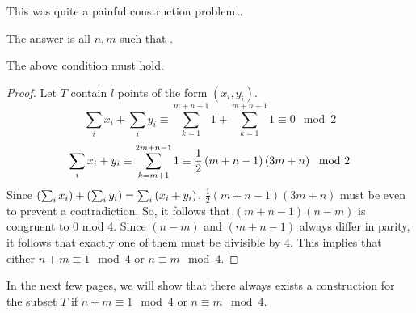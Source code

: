 \documentclass[10pt]{../usamts}
\begin{document}
\begin{solution}
This was quite a painful construction problem\dots

The answer is all $n,m$ such that .

\begin{claim}
    The above condition must hold.
\end{claim}
\begin{proof}
    Let $T$ contain $l$ points of the form $(x_i,y_i)$.
    $$\sum_i x_i + \sum_i y_i \equiv \sum_{k=1}^{m+n-1} 1 + \sum_{k=1}^{m+n-1} 1 \equiv 0 \mod 2$$
    $$\sum_i x_i + y_i \equiv \sum_{k=m+1}^{2m+n-1} 1 \equiv \frac{1}{2} \left( m+n-1 \right)\left( 3m+n \right) \mod 2$$
    Since $\left( \sum_i x_i \right) + \left( \sum_i y_i \right) = \sum_i \left( x_i+y_i \right)$, $\frac{1}{2} (m+n-1)(3m+n)$ must be even to prevent a contradiction.
    So, it follows that $(m+n-1)(n-m)$ is congruent to 0 mod 4. Since $(n-m)$ and $(m+n-1)$ always differ in parity, it follows that exactly one of them must be divisible by 4. This implies that either $n+m \equiv 1 \mod 4$ or $n \equiv m \mod 4$.
\end{proof}

\newcommand{\mainaxis}{
    Select the points on the main axis so that each diagonal intersects exactly one point:
    \begin{enumerate}
        \item Select all the points of the form $(m, m+2k-1)$ for $1 \leq k \leq \floor{\frac{n}{2}}$
        \item Select all the points of the form $(m, m-2k)$ for $1 \leq k \leq \floor{\frac{m-1}{2}}$
        \item Select all the points of the form $(m+2k, m)$ for $1 \leq k \leq \floor{\frac{n-1}{2}}$
        \item Select all the points of the form $(m-2k+1, m)$ for $1 \leq k \leq \floor{\frac{m}{2}}$
    \end{enumerate}
}

In the next few pages, we will show that there always exists a construction for the subset $T$ if $n+m \equiv 1 \mod 4$ or $n \equiv m \mod 4$.


\end{solution}
\end{document}
